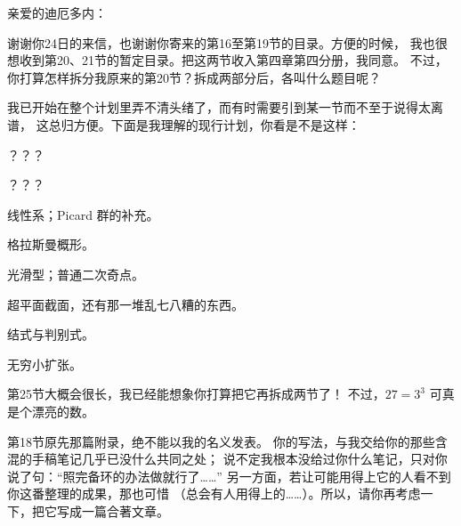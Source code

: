 \begingroup
\def\newscope{V-L-letter}
\def\depth{\operatorname{depth}}
\def\FF{\mathcal F}
\noindent 亲爱的迪厄多内：

谢谢你24日的来信，也谢谢你寄来的第16至第19节的目录。方便的时候，
我也很想收到第20、21节的暂定目录。把这两节收入第四章第四分册，我同意。
不过，你打算怎样拆分我原来的第20节？拆成两部分后，各叫什么题目呢？

我已开始在整个计划里弄不清头绪了，而有时需要引到某一节而不至于说得太离谱，
这总归方便。下面是我理解的现行计划，你看是不是这样：

\begin{list}{}{\setlength{\leftmargin}{3em}\setlength{\itemsep}{1pt}\setlength{\topsep}{4pt}\setlength{\parsep}{0pt}}
 \item[20.] ？？？
 \item[21.] ？？？
 \item[22.] 线性系；Picard 群的补充。
 \item[23.] 格拉斯曼概形。
 \item[24.] 光滑型；普通二次奇点。
 \item[25.] 超平面截面，还有那一堆乱七八糟的东西。
 \item[26.] 结式与判别式。
 \item[27.] 无穷小扩张。
\end{list}

\begin{samepage}
第25节大概会很长，我已经能想象你打算把它再拆成两节了！
不过，\(27=3^3\) 可真是个漂亮的数。
\par\end{samepage}

第18节原先那篇附录，绝不能以我的名义发表。
你的写法，与我交给你的那些含混的手稿笔记几乎已没什么共同之处；
说不定我根本没给过你什么笔记，只对你说了句：“照完备环的办法做就行了……”
另一方面，若让可能用得上它的人看不到你这番整理的成果，那也可惜
（总会有人用得上的……）。所以，请你再考虑一下，把它写成一篇合著文章。

